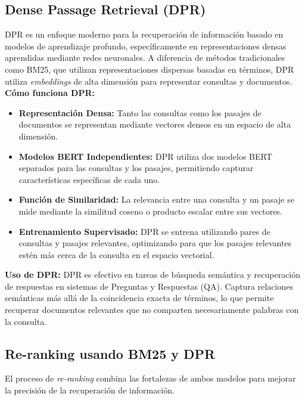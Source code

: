 \documentclass[runningheads]{llncs}
\begin{document}
\subsection*{Dense Passage Retrieval (DPR)}
DPR es un enfoque moderno para la recuperación de información basado en modelos de aprendizaje profundo, específicamente en representaciones densas aprendidas mediante redes neuronales. A diferencia de métodos tradicionales como BM25, que utilizan representaciones dispersas basadas en términos, DPR utiliza \emph{embeddings} de alta dimensión para representar consultas y documentos.\\

\textbf{Cómo funciona DPR:}
\begin{itemize}
    \item \textbf{Representación Densa:} Tanto las consultas como los pasajes de documentos se representan mediante vectores densos en un espacio de alta dimensión.
    \item \textbf{Modelos BERT Independientes:} DPR utiliza dos modelos BERT\cite{bert} separados para las consultas y los pasajes, permitiendo capturar características específicas de cada uno.
    \item \textbf{Función de Similaridad:} La relevancia entre una consulta y un pasaje se mide mediante la similitud coseno\cite{cosine} o producto escalar entre sus vectores.
    \item \textbf{Entrenamiento Supervisado:} DPR se entrena utilizando pares de consultas y pasajes relevantes, optimizando para que los pasajes relevantes estén más cerca de la consulta en el espacio vectorial.
\end{itemize}

\textbf{Uso de DPR:}
DPR es efectivo en tareas de búsqueda semántica y recuperación de respuestas en sistemas de Preguntas y Respuestas (QA). Captura relaciones semánticas más allá de la coincidencia exacta de términos, lo que permite recuperar documentos relevantes que no comparten necesariamente palabras con la consulta.

\subsection*{Re-ranking usando BM25 y DPR}
El proceso de \emph{re-ranking} combina las fortalezas de ambos modelos para mejorar la precisión de la recuperación de información.\\
\end{document}
